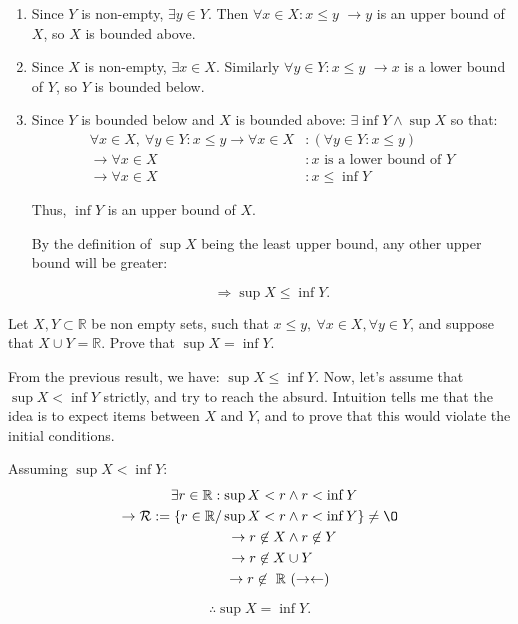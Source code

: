\begin{solution}
\begin{enumerate}[label=\roman*)]
	\item Since $Y$ is non-empty, $\exists y \in Y$. Then $\forall x \in X: x \leq y$
	$\rightarrow y$ is an upper bound of $X$, so $X$ is bounded above.

	\item Since $X$ is non-empty, $\exists x \in X$. Similarly $\forall y \in Y: x \leq y$
	$\rightarrow x$ is a lower bound of $Y$, so $Y$ is bounded below.

	\item Since $Y$ is bounded below and $X$ is bounded above: $\exists \inf{Y} \land \sup{X}$ so that:
	\begin{align*}
	\forall x \in X,\ \forall y \in Y: x \leq y
	\rightarrow \forall x \in X&: \left(\forall y \in Y: x \leq y\right)\\
	\rightarrow \forall x \in X&: x \text{ is a lower bound of } Y\\
	\rightarrow \forall x \in X&: x \leq \inf{Y}
	\end{align*}

	Thus, $\inf{Y}$ is an upper bound of $X$.

	By the definition of $\sup{X}$ being the least upper bound, any other upper bound will be greater:

	$$\Rightarrow \sup{X} \leq \inf{Y}.$$
\end{enumerate}
\end{solution}

\begin{problem}\label{prob:dedekind-2}
Let $X, Y \subset \mathbb{R}$ be non empty sets, such that
$x \leq y, \ \forall x \in X, \forall y \in Y$, and suppose that
$X \cup Y = \mathbb{R}$. Prove that $\sup{X} = \inf{Y}.$
\end{problem}

\begin{solution}
From the previous result, we have: $\sup{X} \leq \inf{Y}$.
Now, let's assume that $\sup{X} < \inf{Y}$ strictly, and try to reach the absurd. Intuition tells me that the idea is to expect items between $X$ and $Y$, and to prove that this would violate the initial conditions.



Assuming $\sup{X} < \inf{Y}:$
\begin{align*}
\exists r \in \mathbb{R}: \sup{X} < r &\wedge r < \inf{Y} \\
\rightarrow \mathcal{R} := \{r \in \mathbb{R} / \sup{X} < r &\wedge r < \inf{Y}\} \neq \O \\
\rightarrow r \not\in X &\land r \not\in Y \\
\rightarrow r \not\in X &\cup Y \\
\rightarrow r \not\in \ \mathbb{R}& \ (\rightarrow\leftarrow)
\end{align*}

$$\therefore \sup{X} = \inf{Y}.$$
\end{solution}

